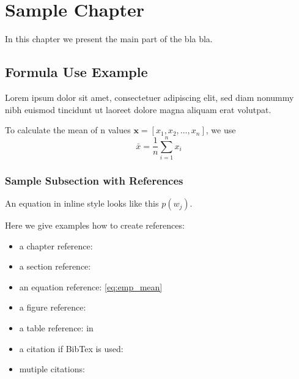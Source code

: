 \chapter{Sample Chapter}
\label{chp:sample_chapter}
In this chapter we present the main part of the bla bla.

\section{Formula Use Example}
\label{sec:forumla}
Lorem ipsum dolor sit amet, consectetuer adipiscing elit, sed diam nonummy nibh euismod tincidunt ut laoreet dolore magna aliquam erat volutpat. %

To calculate the mean of n values $\mathbf{x} = [x_1, x_2, ..., x_n]$, we use
\begin{equation}
	\bar{x} = \frac{1}{n} \sum_{i=1}^{n}{x_i}
	\label{eq:emp_mean}
\end{equation}


\subsection{Sample Subsection with References}
\label{sec:sample_subsection}
An equation in inline style looks like this $p(w_j)$.

Here we give examples how to create references:
\begin{itemize}
	\item a chapter reference: 
	\item a section reference: 
	\item an equation reference: \eqref{eq:emp_mean}
	\item a figure reference: 
	\item a table reference:  in 
	\item a citation if BibTex is used: %
	\item mutiple citations: %
\end{itemize}


